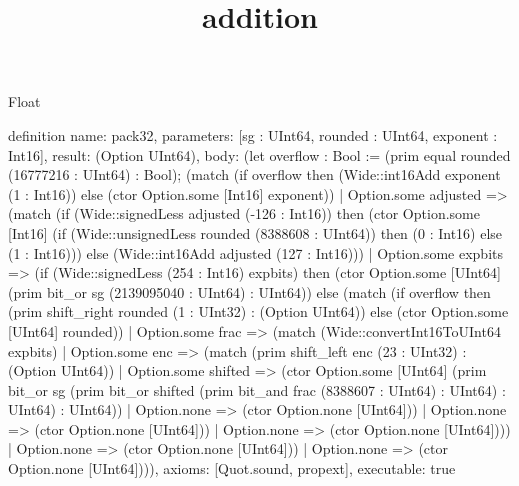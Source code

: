 \begin{lexlean}{Float}
\title{addition}
\begin{semanticmodule}
definition{
  name: pack32,
  parameters: [sg : UInt64, rounded : UInt64, exponent : Int16],
  result: (Option UInt64),
  body: (let overflow : Bool := (prim equal rounded (16777216 : UInt64) : Bool); (match (if overflow then (Wide::int16Add exponent (1 : Int16)) else (ctor Option.some [Int16] exponent))
    | Option.some adjusted => (match (if (Wide::signedLess adjusted (-126 : Int16)) then (ctor Option.some [Int16] (if (Wide::unsignedLess rounded (8388608 : UInt64)) then (0 : Int16) else (1 : Int16))) else (Wide::int16Add adjusted (127 : Int16)))
      | Option.some expbits => (if (Wide::signedLess (254 : Int16) expbits) then (ctor Option.some [UInt64] (prim bit_or sg (2139095040 : UInt64) : UInt64)) else (match (if overflow then (prim shift_right rounded (1 : UInt32) : (Option UInt64)) else (ctor Option.some [UInt64] rounded))
        | Option.some frac => (match (Wide::convertInt16ToUInt64 expbits)
          | Option.some enc => (match (prim shift_left enc (23 : UInt32) : (Option UInt64))
            | Option.some shifted => (ctor Option.some [UInt64] (prim bit_or sg (prim bit_or shifted (prim bit_and frac (8388607 : UInt64) : UInt64) : UInt64) : UInt64))
            | Option.none => (ctor Option.none [UInt64]))
          | Option.none => (ctor Option.none [UInt64]))
        | Option.none => (ctor Option.none [UInt64])))
      | Option.none => (ctor Option.none [UInt64]))
    | Option.none => (ctor Option.none [UInt64]))),
  axioms: [Quot.sound, propext],
  executable: true
}


\end{semanticmodule}
\end{lexlean}
